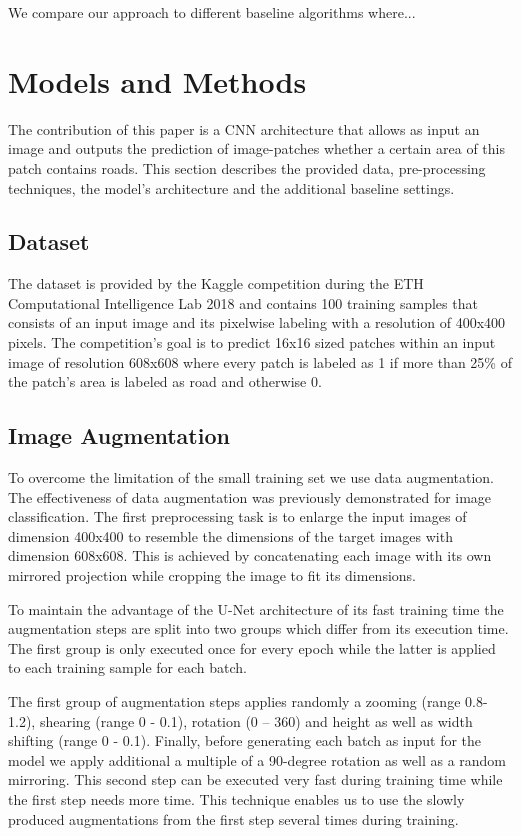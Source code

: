 \documentclass[10pt,conference,compsocconf]{IEEEtran}
\begin{document}
We compare our approach to different baseline algorithms where...

\section{Models and Methods}

The contribution of this paper is a CNN architecture that allows as input an image and outputs the prediction of image-patches whether a certain area of this patch contains roads. This section describes the provided data, pre-processing techniques, the model’s architecture and the additional baseline settings.

\subsection{Dataset}

The dataset is provided by the Kaggle competition during the ETH Computational Intelligence Lab 2018 \cite{KaggleCompetition} and contains 100 training samples that consists of an input image and its pixelwise labeling with a resolution of 400x400 pixels. The competition’s goal is to predict 16x16 sized patches within an input image of resolution 608x608 where every patch is labeled as 1 if more than 25\% of the patch’s area is labeled as road and otherwise 0.

\subsection{Image Augmentation}

To overcome the limitation of the small training set we use data augmentation. The effectiveness of data augmentation was previously demonstrated \cite{Wang} for image classification. The first preprocessing task is to enlarge the input images of dimension 400x400 to resemble the dimensions of the target images with dimension 608x608. This is achieved by concatenating each image with its own mirrored projection while cropping the image to fit its dimensions.

To  maintain the advantage of the U-Net architecture of its fast training time \cite{Ronneberger2015} the augmentation steps are split into two groups which differ from its execution time. The first group is only executed once for every epoch while the latter is applied to each training sample for each batch.

The first group of augmentation steps applies randomly a zooming (range 0.8-1.2), shearing (range 0 - 0.1), rotation (0 – 360) and height as well as width shifting (range 0 - 0.1). Finally, before generating each batch as input for the model we apply additional a multiple of a 90-degree rotation as well as a random mirroring. This second step can be executed very fast during training time while the first step needs more time. This technique enables us to use the slowly produced augmentations from the first step several times during training.
\end{document}
